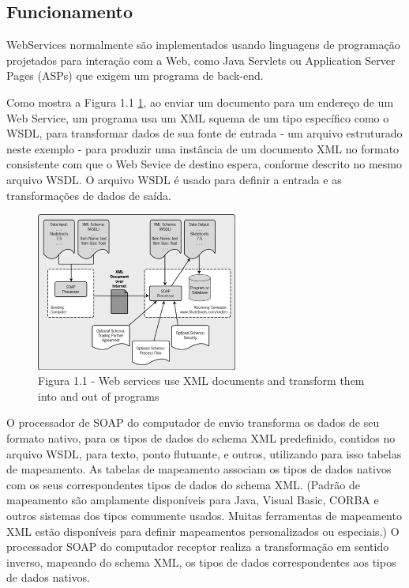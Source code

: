 \documentclass{acm_proc_article-sp}
\begin{document}
	
	\subsection{Funcionamento}
		
		WebServices normalmente são implementados usando linguagens de programação projetados para interação com a Web, como Java Servlets ou Application Server Pages (ASPs) que exigem um programa de back-end.
		
		Como mostra a Figura 1.1 \ref{fig:WebServiceFuncionamento}, ao enviar um documento para um endereço de um Web Service, um programa usa um XML squema de um tipo específico como o WSDL, para transformar dados de sua fonte de entrada - um arquivo estruturado neste exemplo - para produzir uma instância de um documento XML no formato consistente com que o Web Sevice de destino espera, conforme descrito no mesmo arquivo WSDL. O arquivo WSDL é usado para definir a entrada e as transformações de dados de saída.
		

\begin{figure}[h]
	\begin{center}
			\includegraphics[width=250px]{WebServiceFuncionamento}
				 \caption{Figura 1.1 - Web services use XML documents and transform them into and out of programs}
			\label{fig:WebServiceFuncionamento}
	\end{center}
\end{figure}

		
		O processador de SOAP do computador de envio transforma os dados de seu formato nativo, para os tipos de dados do schema XML predefinido, contidos no arquivo WSDL, para texto, ponto flutuante, e outros, utilizando para isso tabelas de mapeamento. As tabelas de mapeamento associam os tipos de dados nativos com os seus correspondentes tipos de dados do schema XML. (Padrão de mapeamento são amplamente disponíveis para Java, Visual Basic, CORBA e outros sistemas dos tipos comumente usados. Muitas ferramentas de mapeamento XML estão disponíveis para definir mapeamentos personalizados ou especiais.) O processador SOAP do computador receptor realiza a transformação em sentido inverso, mapeando do schema XML, os tipos de dados correspondentes aos tipos de dados nativos.
		
\end{document}
